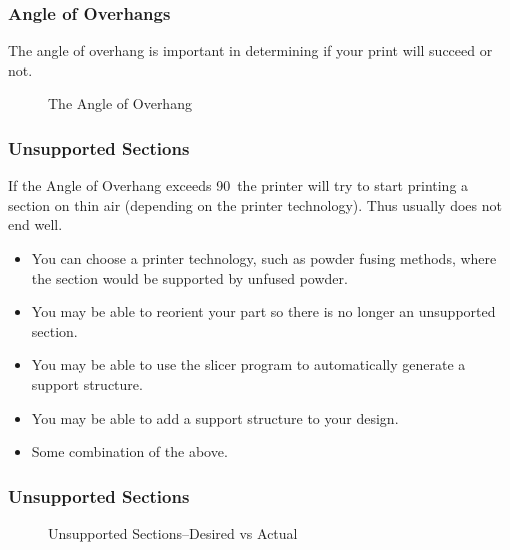 \documentclass[english,10pt]{beamer}
\begin{document}
\begin{frame}
  \frametitle{Angle of Overhangs}
  The angle of overhang is important in determining if your print will succeed or not.
  \begin{figure}
    
    \caption{The Angle of Overhang}
  \end{figure}
\end{frame}

\begin{frame}
  \frametitle{Unsupported Sections}
  If the Angle of Overhang exceeds 90\degree\ the printer will try to start printing a section on thin air (depending on the printer technology).  Thus usually does not end well.
  \begin{itemize}
    \item You can choose a printer technology, such as powder fusing methods, where the section would be supported by unfused powder.
    \item You may be able to reorient your part so there is no longer an unsupported section.
    \item You may be able to use the slicer program to automatically generate a support structure.
    \item You may be able to add a support structure to your design.
    \item Some combination of the above.
  \end{itemize}
\end{frame}

\begin{frame}
  \frametitle{Unsupported Sections}
  \begin{figure}
    
    \caption{Unsupported Sections--Desired vs Actual}
  \end{figure}
\end{frame}

%
%
\end{document}
